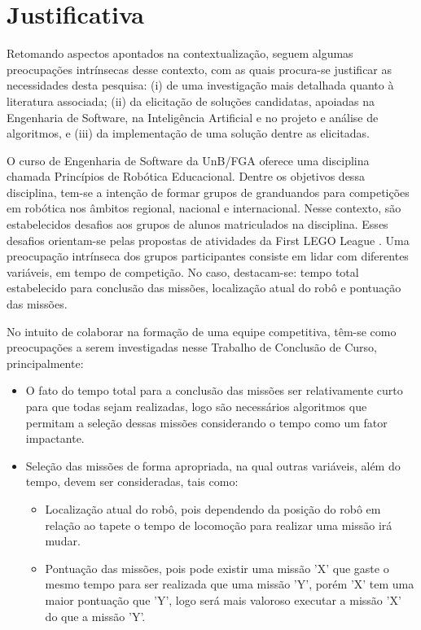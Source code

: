\section{Justificativa}

Retomando aspectos apontados na contextualização, seguem algumas preocupações intrínsecas desse contexto, com as quais procura-se justificar as necessidades desta pesquisa: (i) de uma investigação mais detalhada quanto à literatura associada; (ii) da elicitação de soluções candidatas, apoiadas na Engenharia de Software, na Inteligência Artificial e no projeto e análise de algoritmos, e (iii) da implementação de uma solução dentre as elicitadas.

O curso de Engenharia de Software da UnB/FGA oferece uma disciplina chamada Princípios de Robótica Educacional. Dentre os objetivos dessa disciplina, tem-se a intenção de formar grupos de granduandos para competições em robótica nos âmbitos regional, nacional e internacional. Nesse contexto, são estabelecidos desafios aos grupos de alunos matriculados na disciplina. Esses desafios orientam-se pelas propostas de atividades da First LEGO League \cite{kamenfirst}. Uma preocupação intrínseca dos grupos participantes consiste em lidar com diferentes variáveis, em tempo de competição. No caso, destacam-se: tempo total estabelecido para conclusão das missões, localização atual do robô e pontuação das missões.

No intuito de colaborar na formação de uma equipe competitiva, têm-se como preocupações a serem investigadas nesse Trabalho de Conclusão de Curso, principalmente:

\begin{itemize}
\item O fato do tempo total para a conclusão das missões ser relativamente curto para que todas sejam realizadas, logo são necessários algoritmos que permitam a seleção dessas missões considerando o tempo como um fator impactante.

\item Seleção das missões de forma apropriada, na qual outras variáveis, além do tempo, devem ser consideradas, tais como: 
\begin{itemize}
\item Localização atual do robô, pois dependendo da posição do robô em relação ao tapete o tempo de locomoção para realizar uma missão irá mudar.   
\item Pontuação das missões, pois pode existir uma missão 'X' que gaste o mesmo tempo para ser realizada que uma missão 'Y', porém 'X' tem uma maior pontuação que 'Y', logo será mais valoroso executar a missão 'X' do que a missão 'Y'.
\end{itemize} 
\end{itemize}
 

